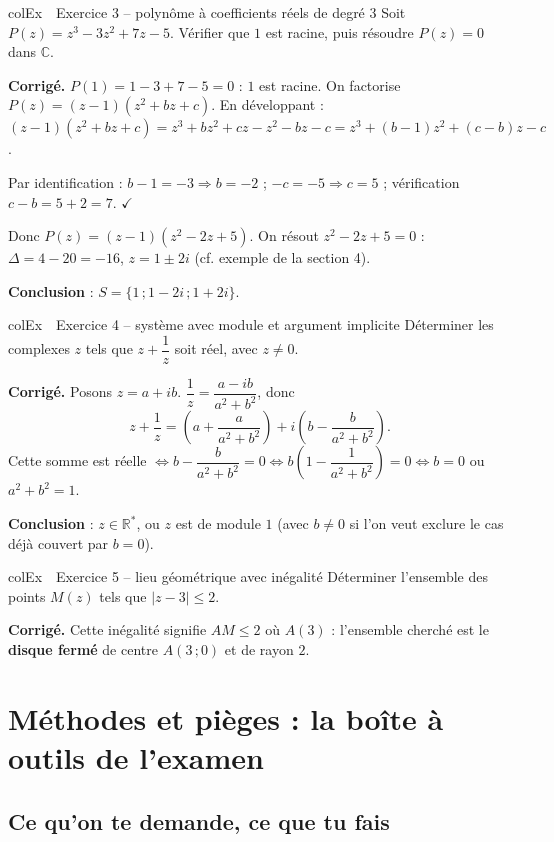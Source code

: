 \documentclass[11pt,a4paper]{article}
\newenvironment{exemple}[1][Exemple]
  {\begin{fiche}{colEx}{\ding{217}~~#1}}{\end{fiche}}
\begin{document}
\begin{exemple}[Exercice 3 -- polynôme à coefficients réels de degré 3]
Soit $P(z)=z^3-3z^2+7z-5$. Vérifier que $1$ est racine, puis résoudre $P(z)=0$ dans $\mathbb{C}$.

\smallskip
\textbf{Corrigé.} $P(1)=1-3+7-5=0$ : $1$ est racine. On factorise $P(z)=(z-1)(z^2+bz+c)$. En développant : $(z-1)(z^2+bz+c)=z^3+bz^2+cz-z^2-bz-c=z^3+(b-1)z^2+(c-b)z-c$.

\smallskip
Par identification : $b-1=-3\Rightarrow b=-2$ ; $-c=-5\Rightarrow c=5$ ; vérification $c-b=5+2=7$. $\checkmark$

\smallskip
Donc $P(z)=(z-1)(z^2-2z+5)$. On résout $z^2-2z+5=0$ : $\Delta=4-20=-16$, $z=1\pm2i$ (cf. exemple de la section 4).

\smallskip
\textbf{Conclusion} : $S=\{1\,;1-2i\,;1+2i\}$.
\end{exemple}

\begin{exemple}[Exercice 4 -- système avec module et argument implicite]
Déterminer les complexes $z$ tels que $z+\dfrac1z$ soit réel, avec $z\ne0$.

\smallskip
\textbf{Corrigé.} Posons $z=a+ib$. $\dfrac1z=\dfrac{a-ib}{a^2+b^2}$, donc
\[
  z+\frac1z = \left(a+\frac{a}{a^2+b^2}\right) + i\left(b-\frac{b}{a^2+b^2}\right).
\]
Cette somme est réelle $\iff b-\dfrac{b}{a^2+b^2}=0 \iff b\left(1-\dfrac{1}{a^2+b^2}\right)=0 \iff b=0$ ou $a^2+b^2=1$.

\smallskip
\textbf{Conclusion} : $z\in\mathbb{R}^*$, ou $z$ est de module $1$ (avec $b\ne0$ si l'on veut exclure le cas déjà couvert par $b=0$).
\end{exemple}

\begin{exemple}[Exercice 5 -- lieu géométrique avec inégalité]
Déterminer l'ensemble des points $M(z)$ tels que $|z-3| \leq 2$.

\smallskip
\textbf{Corrigé.} Cette inégalité signifie $AM\leq2$ où $A(3)$ : l'ensemble cherché est le \textbf{disque fermé} de centre $A(3\,;0)$ et de rayon $2$.
\end{exemple}

\section{Méthodes et pièges : la boîte à outils de l'examen}

\subsection{Ce qu'on te demande, ce que tu fais}
\end{document}
